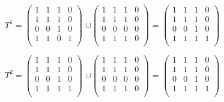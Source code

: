 \documentclass{article}
\begin{document}
\vspace{5mm}
\par
\hspace{8mm} $T^1 =
	\begin{pmatrix}
		1 & 1 & 1 & 0 \\
		1 & 1 & 1 & 0 \\
		0 & 0 & 1 & 0 \\
		1 & 1 & 0 & 1 \\
	\end{pmatrix}$
$∪\begin{pmatrix}
		1 & 1 & 1 & 0 \\
		1 & 1 & 1 & 0 \\
		0 & 0 & 0 & 0 \\
		1 & 1 & 1 & 0 \\
	\end{pmatrix}$ =
$\begin{pmatrix}
		1 & 1 & 1 & 0 \\
		1 & 1 & 1 & 0 \\
		0 & 0 & 1 & 0 \\
		1 & 1 & 1 & 1 \\
	\end{pmatrix}$
\vspace{5mm}
\par
\hspace{8mm}
\hspace*{55mm}{k = 2, k - 1 = 1}
\vspace{5mm}
\par
\hspace{8mm} $T^2 =
	\begin{pmatrix}
		1 & 1 & 1 & 0 \\
		1 & 1 & 1 & 0 \\
		0 & 0 & 1 & 0 \\
		1 & 1 & 1 & 1 \\
	\end{pmatrix}$
$∪\begin{pmatrix}
		1 & 1 & 1 & 0 \\
		1 & 1 & 1 & 0 \\
		0 & 0 & 0 & 0 \\
		1 & 1 & 1 & 0 \\
	\end{pmatrix}$ =
$\begin{pmatrix}
		1 & 1 & 1 & 0 \\
		1 & 1 & 1 & 0 \\
		0 & 0 & 1 & 0 \\
		1 & 1 & 1 & 1 \\
	\end{pmatrix}$
\end{document}
